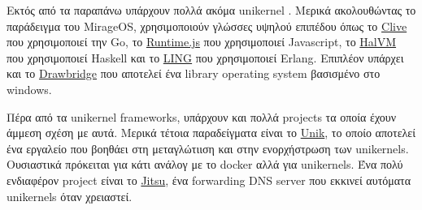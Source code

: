 Εκτός από τα παραπάνω υπάρχουν πολλά ακόμα unikernel . Μερικά
ακολουθώντας το παράδειγμα του MirageOS, χρησιμοποιούν γλώσσες υψηλού επιπέδου
όπως το \href{http://lsub.org/ls/clive.html}{Clive} που χρησιμοποιεί την Go, το
\href{http://runtimejs.org/}{Runtime.js} που χρησιμοποιεί Javascript, το
\href{http://galois.com/project/halvm/}{HalVM} που χρησιμοποιεί Haskell και το
\href{http://erlangonxen.org/}{LING} που χρησιμοποιεί Erlang. Επιπλέον
υπάρχει και το
\href{http://research.microsoft.com/en-us/projects/drawbridge/}{Drawbridge} που
αποτελεί ένα library operating system βασισμένο στο windows. 

Πέρα από τα unikernel frameworks, υπάρχουν και πολλά projects τα οποία έχουν
άμμεση σχέση με αυτά. Μερικά τέτοια παραδείγματα είναι το
\href{https://github.com/emc-advanced-dev/unik}{Unik}, το οποίο αποτελεί ένα
εργαλείο που βοηθάει στη μεταγλώτιιση και στην ενορχήστρωση των unikernels.
Ουσιαστικά πρόκειται για κάτι ανάλογ με το docker αλλά για unikernels. Ένα πολύ
ενδιαφέρον project είναι το \href{https://github.com/mirage/jitsu}{Jitsu}, ένα
forwarding DNS server που εκκινεί αυτόματα unikernels όταν χρειαστεί.  
